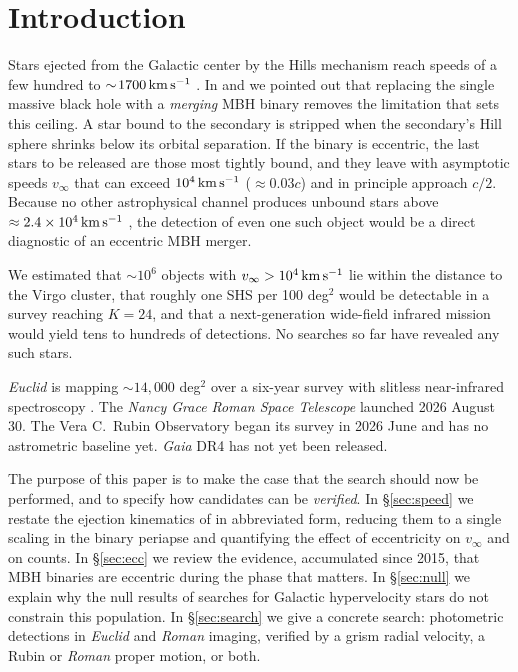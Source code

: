 \documentclass[twocolumn]{aastex701}
\newcommand{\vinf}{v_{\infty}}
\newcommand{\kms}{\,{\rm km\,s^{-1}}}
\begin{document}

\section{Introduction}
\label{sec:intro}

Stars ejected from the Galactic center by the Hills mechanism \citep{hills88}
reach speeds of a few hundred to $\sim\!1700\kms$
\citep{brown05,brown15,koposov20}. In \citet{gl14} and \citet[hereafter
]{gl15} we pointed out that replacing the single massive
black hole with a \emph{merging} MBH binary
removes the limitation that sets this ceiling. A star bound to the secondary is
stripped when the secondary's Hill sphere shrinks below its orbital separation.
If the binary is eccentric, the last stars to be released are those most tightly
bound, and they leave with asymptotic speeds $\vinf$ that can exceed
$10^{4}\kms$ ($\approx0.03c$) and in principle approach $c/2$. Because no
other astrophysical channel produces unbound stars above
$\approx 2.4\times10^{4}\kms$ \citep{sari10,ginsburg12}, the detection of even
one such object would be a direct diagnostic of an eccentric MBH merger.

We estimated that $\sim\!10^{6}$ objects with $\vinf>10^{4}\kms$ lie within the
distance to the Virgo cluster, that roughly one SHS per 100 deg$^{2}$ would be
detectable in a survey reaching $K=24$, and that a next-generation wide-field
infrared mission would yield tens to hundreds of detections. No searches so
far have revealed any such stars.

\textit{Euclid} is mapping $\sim\!14{,}000$ deg$^{2}$ over a six-year survey
with slitless near-infrared spectroscopy \citep{euclid25}. The
\textit{Nancy Grace Roman Space Telescope} launched 2026 August 30. The Vera C.\
Rubin Observatory began its survey in 2026 June and has no astrometric
baseline yet. \textit{Gaia} DR4 has not yet been released.

The purpose of this paper is to make the case that the search should now be
performed, and to specify how candidates can be \emph{verified}. In
\S\ref{sec:speed} we restate the ejection kinematics of
 in abbreviated form, reducing them to a single scaling in the
binary periapse and quantifying the effect of eccentricity on $\vinf$ and on counts. In \S\ref{sec:ecc} we
review the evidence, accumulated since 2015, that MBH binaries are eccentric
during the phase that matters. In \S\ref{sec:null} we explain why the null results of
searches for Galactic hypervelocity stars do not constrain this population. In
\S\ref{sec:search} we give a concrete search: photometric detections in
\textit{Euclid} and \textit{Roman} imaging, verified by a grism radial
velocity, a Rubin or \textit{Roman} proper motion, or both.
\end{document}
